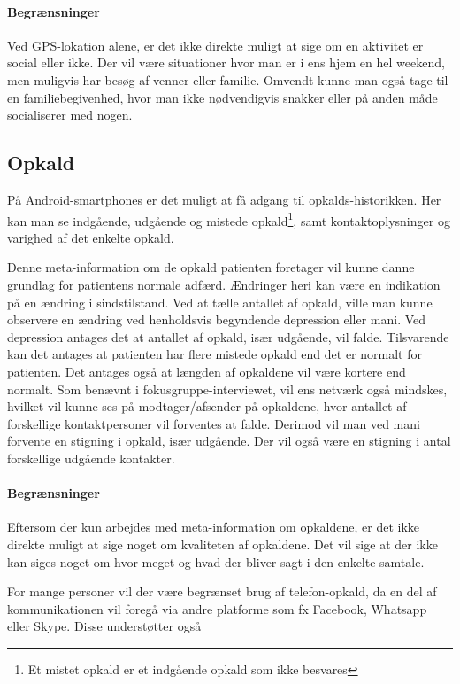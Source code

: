 \paragraph{Begrænsninger}
Ved GPS-lokation alene, er det ikke direkte muligt at sige om en aktivitet er social eller ikke.
Der vil være situationer hvor man er i ens hjem en hel weekend, men muligvis har besøg af venner eller familie.
Omvendt kunne man også tage til en familiebegivenhed, hvor man ikke nødvendigvis snakker eller på anden måde socialiserer med nogen.

\subsection{Opkald}
På Android-smartphones er det muligt at få adgang til opkalds-historikken.
Her kan man se indgående, udgående og mistede opkald\footnote{Et mistet opkald er et indgående opkald som ikke besvares}, samt kontaktoplysninger og varighed af det enkelte opkald.

Denne meta-information om de opkald patienten foretager vil kunne danne grundlag for patientens normale adfærd.
Ændringer heri kan være en indikation på en ændring i sindstilstand.
Ved at tælle antallet af opkald, ville man kunne observere en ændring ved henholdsvis begyndende depression eller mani.
Ved depression antages det at antallet af opkald, især udgående, vil falde.
Tilsvarende kan det antages at patienten har flere mistede opkald end det er normalt for patienten.
Det antages også at længden af opkaldene vil være kortere end normalt.
Som benævnt i fokusgruppe-interviewet, vil ens netværk også mindskes, hvilket vil kunne ses på modtager/afsender på opkaldene, hvor antallet af forskellige kontaktpersoner vil forventes at falde.
Derimod vil man ved mani forvente en stigning i opkald, især udgående.
Der vil også være en stigning i antal forskellige udgående kontakter.

\paragraph{Begrænsninger}
Eftersom der kun arbejdes med meta-information om opkaldene, er det ikke direkte muligt at sige noget om kvaliteten af opkaldene.
Det vil sige at der ikke kan siges noget om hvor meget og hvad der bliver sagt i den enkelte samtale.

For mange personer  vil der være begrænset brug af telefon-opkald, da en del af kommunikationen vil foregå via andre platforme som fx Facebook, Whatsapp eller Skype.
Disse understøtter også 

